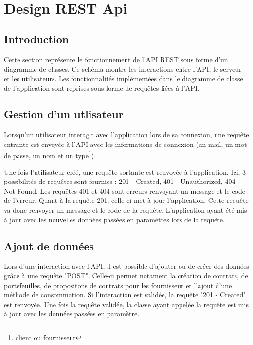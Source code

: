 \section{Design REST Api}
\subsection{Introduction}
\begin{flushleft}
Cette section représente le fonctionnement de l'API REST sous forme d'un diagramme de classes. Ce schéma montre les interactions entre l'API, le serveur et les utilisateurs. Les fonctionnalités implémentées dans le diagramme de classe de l'application sont reprises sous forme de requêtes liées à l'API.
\end{flushleft}

\subsection{Gestion d'un utlisateur}
\begin{flushleft}
Lorsqu'un utilisateur interagit avec l'application lors de sa connexion, une requête entrante est envoyée à l'API avec les informations de connexion (un mail, un mot de passe, un nom et un type\footnote{client ou fournisseur}).
\end{flushleft}

\begin{flushleft}
Une fois l'utilisateur créé, une requête sortante est renvoyée à l'application. Ici, 3 possibilités de requêtes sont fournies : 201 - Created, 401 - Unauthorized, 404 - Not Found. Les requêtes 401 et 404 sont erreurs renvoyant un message et le code de l'erreur. Quant à la requête 201, celle-ci met à jour l'application. Cette requête va donc renvoyer un message et le code de la requête. L'application ayant été mis à jour avec les nouvelles données passées en paramètres lors de la requête.
\end{flushleft}

\subsection{Ajout de données}
\begin{flushleft}
Lors d'une interaction avec l'API, il est possible d'ajouter ou de créer des données grâce à une requête "POST". Celle-ci permet notament la création de contrats, de portefeuilles, de propositons de contrats pour les fournisseur et l'ajout d'une méthode de consommation. Si l'interaction est validée, la requête "201 - Created" est renvoyée. Une fois la requête validée, la classe ayant appelée la requête est mis à jour avec les données passées en paramètre.
\end{flushleft}
\newpage
